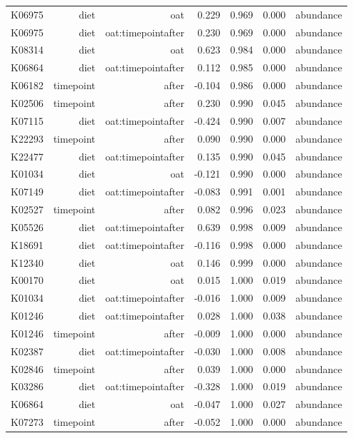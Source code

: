\documentclass[
]{article}
\begin{document}
\begin{longtable}[t]{lrrrrrr}
K06975 & diet & oat & 0.229 & 0.969 & 0.000 & abundance\\
K06975 & diet & oat:timepointafter & 0.230 & 0.969 & 0.000 & abundance\\
K08314 & diet & oat & 0.623 & 0.984 & 0.000 & abundance\\
K06864 & diet & oat:timepointafter & 0.112 & 0.985 & 0.000 & abundance\\
\addlinespace
K06182 & timepoint & after & -0.104 & 0.986 & 0.000 & abundance\\
K02506 & timepoint & after & 0.230 & 0.990 & 0.045 & abundance\\
K07115 & diet & oat:timepointafter & -0.424 & 0.990 & 0.007 & abundance\\
K22293 & timepoint & after & 0.090 & 0.990 & 0.000 & abundance\\
K22477 & diet & oat:timepointafter & 0.135 & 0.990 & 0.045 & abundance\\
\addlinespace
K01034 & diet & oat & -0.121 & 0.990 & 0.000 & abundance\\
K07149 & diet & oat:timepointafter & -0.083 & 0.991 & 0.001 & abundance\\
K02527 & timepoint & after & 0.082 & 0.996 & 0.023 & abundance\\
K05526 & diet & oat:timepointafter & 0.639 & 0.998 & 0.009 & abundance\\
K18691 & diet & oat:timepointafter & -0.116 & 0.998 & 0.000 & abundance\\
\addlinespace
K12340 & diet & oat & 0.146 & 0.999 & 0.000 & abundance\\
K00170 & diet & oat & 0.015 & 1.000 & 0.019 & abundance\\
K01034 & diet & oat:timepointafter & -0.016 & 1.000 & 0.009 & abundance\\
K01246 & diet & oat:timepointafter & 0.028 & 1.000 & 0.038 & abundance\\
K01246 & timepoint & after & -0.009 & 1.000 & 0.000 & abundance\\
\addlinespace
K02387 & diet & oat:timepointafter & -0.030 & 1.000 & 0.008 & abundance\\
K02846 & timepoint & after & 0.039 & 1.000 & 0.000 & abundance\\
K03286 & diet & oat:timepointafter & -0.328 & 1.000 & 0.019 & abundance\\
K06864 & diet & oat & -0.047 & 1.000 & 0.027 & abundance\\
K07273 & timepoint & after & -0.052 & 1.000 & 0.000 & abundance\\

\end{longtable}
\end{document}
